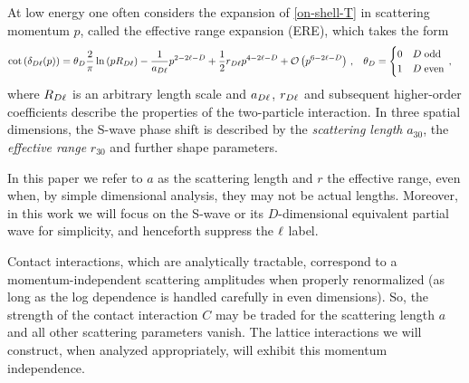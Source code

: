 At low energy one often considers the expansion of \eqref{on-shell-T} in scattering momentum $p$, called the effective range expansion (ERE), which takes the form \cite{Hammer:2010fw}
\begin{align}
    \label{eq:ere}
    \cot \left(\delta_{D\ell}(p)\right)
    &=
    \theta_D \frac{2}{\pi}  \ln \left(p R_{D\ell}\right)
    -
    \frac{1}{a_{D\ell}} p^{2 - 2 \ell - D} +\frac{1}{2} r_{D\ell} p^{4 - 2 \ell - D} + \mathcal{O}\left(p^{6 - 2 \ell - D}\right)
    \, , &
    \theta_D &= \begin{cases}
        0 & D \;\text{odd} \\ 1 & D \;\text{even}
    \end{cases}
    \, ,
\end{align}
where $R_{D \ell}$ is an arbitrary length scale and $a_{D\ell}$, $r_{D\ell}$ and subsequent higher-order coefficients describe the properties of the two-particle interaction.
In three spatial dimensions, the S-wave phase shift is described by the \emph{scattering length} $a_{30}$, the \emph{effective range} $r_{30}$ and further shape parameters.

In this paper we refer to $a$ as the scattering length and $r$ the effective range, even when, by simple dimensional analysis, they may not be actual lengths.
Moreover, in this work we will focus on the S-wave or its $D$-dimensional equivalent partial wave for simplicity, and henceforth suppress the $\ell$ label.

Contact interactions, which are analytically tractable, correspond to a momentum-independent scattering amplitudes when properly renormalized (as long as the log dependence is handled carefully in even dimensions).
So, the strength of the contact interaction $C$ may be traded for the scattering length $a$ and all other scattering parameters vanish.
The lattice interactions we will construct, when analyzed appropriately, will exhibit this momentum independence.
